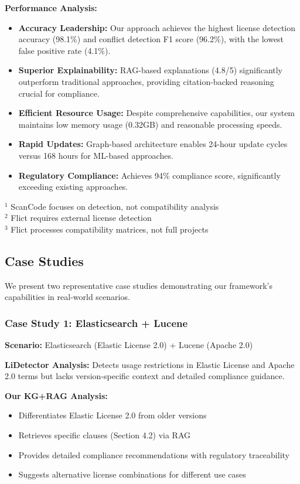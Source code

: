\documentclass[9pt,twocolumn]{article}
\begin{document}
\textbf{Performance Analysis:}
\begin{itemize}
    \item \textbf{Accuracy Leadership:} Our approach achieves the highest license detection accuracy (98.1\%) and conflict detection F1 score (96.2\%), with the lowest false positive rate (4.1\%).
    \item \textbf{Superior Explainability:} RAG-based explanations (4.8/5) significantly outperform traditional approaches, providing citation-backed reasoning crucial for compliance.
    \item \textbf{Efficient Resource Usage:} Despite comprehensive capabilities, our system maintains low memory usage (0.32GB) and reasonable processing speeds.
    \item \textbf{Rapid Updates:} Graph-based architecture enables 24-hour update cycles versus 168 hours for ML-based approaches.
    \item \textbf{Regulatory Compliance:} Achieves 94\% compliance score, significantly exceeding existing approaches.
\end{itemize}

\footnotesize
$^1$ ScanCode focuses on detection, not compatibility analysis \\
$^2$ Flict requires external license detection \\
$^3$ Flict processes compatibility matrices, not full projects

\subsection{Case Studies}
We present two representative case studies demonstrating our framework's capabilities in real-world scenarios.

\subsubsection{Case Study 1: Elasticsearch + Lucene}
\textbf{Scenario:} Elasticsearch (Elastic License 2.0) + Lucene (Apache 2.0)

\textbf{LiDetector Analysis:} Detects usage restrictions in Elastic License and Apache 2.0 terms but lacks version-specific context and detailed compliance guidance.

\textbf{Our KG+RAG Analysis:} 
\begin{itemize}
    \item Differentiates Elastic License 2.0 from older versions
    \item Retrieves specific clauses (Section 4.2) via RAG
    \item Provides detailed compliance recommendations with regulatory traceability
    \item Suggests alternative license combinations for different use cases
\end{itemize}
\end{document}
